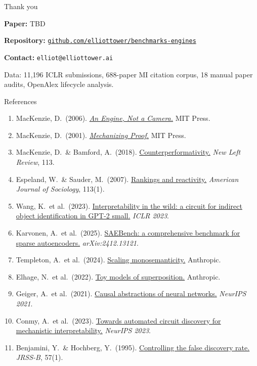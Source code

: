 \documentclass[aspectratio=169,11pt]{beamer}
\begin{document}
\begin{frame}{Thank you}

\textbf{Paper:} TBD

\vspace{0.3em}
\textbf{Repository:} \href{https://github.com/elliottower/benchmarks-engines}{\texttt{github.com/elliottower/benchmarks-engines}}

\vspace{0.3em}
\textbf{Contact:} \texttt{elliot@elliottower.ai}

\vspace{0.8em}

{\small Data: 11,196 ICLR submissions, 688-paper MI citation corpus, 18 manual paper audits, OpenAlex lifecycle analysis.}
\end{frame}

\begin{frame}[allowframebreaks]{References}
{\small
\begin{enumerate}\setlength\itemsep{3pt}
  \item MacKenzie, D.\ (2006). \href{https://mitpress.mit.edu/9780262134606/an-engine-not-a-camera/}{\textit{An Engine, Not a Camera.}} MIT Press.
  \item MacKenzie, D.\ (2001). \href{https://mitpress.mit.edu/9780262632959/mechanizing-proof/}{\textit{Mechanizing Proof.}} MIT Press.
  \item MacKenzie, D.\ \& Bamford, A.\ (2018). \href{https://newleftreview.org/issues/ii113/articles/donald-mackenzie-alice-bamford-counterperformativity}{Counterperformativity.} \textit{New Left Review}, 113.
  \item Espeland, W.\ \& Sauder, M.\ (2007). \href{https://doi.org/10.1086/517897}{Rankings and reactivity.} \textit{American Journal of Sociology}, 113(1).
  \item Wang, K.\ et al.\ (2023). \href{https://arxiv.org/abs/2211.00593}{Interpretability in the wild: a circuit for indirect object identification in GPT-2 small.} \textit{ICLR 2023}.
  \item Karvonen, A.\ et al.\ (2025). \href{https://arxiv.org/abs/2412.13121}{SAEBench: a comprehensive benchmark for sparse autoencoders.} \textit{arXiv:2412.13121}.
  \item Templeton, A.\ et al.\ (2024). \href{https://transformer-circuits.pub/2024/scaling-monosemanticity/}{Scaling monosemanticity.} Anthropic.
  \item Elhage, N.\ et al.\ (2022). \href{https://transformer-circuits.pub/2022/toy_model/}{Toy models of superposition.} Anthropic.
  \item Geiger, A.\ et al.\ (2021). \href{https://arxiv.org/abs/2106.02997}{Causal abstractions of neural networks.} \textit{NeurIPS 2021}.
  \item Conmy, A.\ et al.\ (2023). \href{https://arxiv.org/abs/2304.14997}{Towards automated circuit discovery for mechanistic interpretability.} \textit{NeurIPS 2023}.
  \item Benjamini, Y.\ \& Hochberg, Y.\ (1995). \href{https://doi.org/10.1111/j.2517-6161.1995.tb02031.x}{Controlling the false discovery rate.} \textit{JRSS-B}, 57(1).
\end{enumerate}
}
\end{frame}
\end{document}
